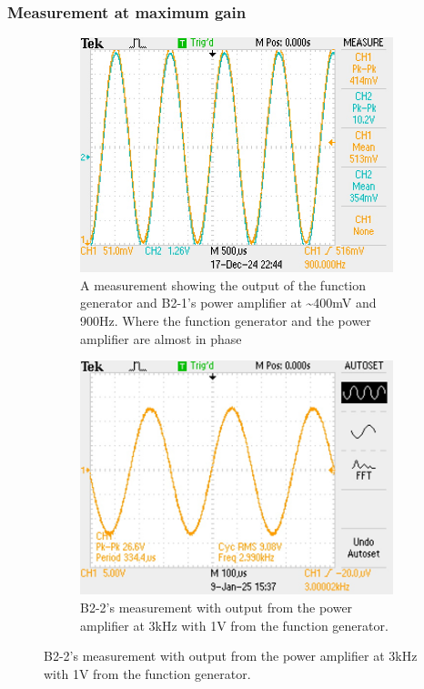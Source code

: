 \subsubsection{Measurement at maximum gain}
\begin{figure}[H]
    \captionsetup{justification=raggedright, labelfont=bf}

\begin{subfigure}[t]{0.5\linewidth}
    \centering
    \includegraphics[width=0.9\linewidth]{TU Delft Booming Bass Project Report/figures/PowerAmplifier/measurements/900Hz.JPG}
    \caption{A measurement showing the output of the function generator and B2-1's power amplifier at \textasciitilde 400mV and 900Hz. Where the function generator and the power amplifier are almost in phase}
    \label{fig:900Hz 400}

\end{subfigure}
\begin{subfigure}[t]{0.5\linewidth}

  \centering
    \includegraphics[width=0.9\linewidth]{TU Delft Booming Bass Project Report/figures/PowerAmplifier/measurements/Afbeelding3.png}
    \caption{B2-2's measurement with output from the power amplifier at 3kHz with 1V from the function generator.}
    \label{fig:B2-2 3kHz}


\end{subfigure}
\end{figure}
